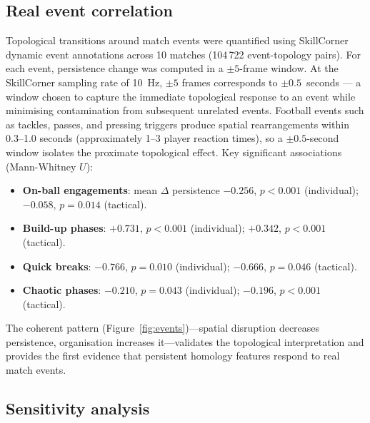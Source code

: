 \documentclass[11pt,a4paper]{article}
\begin{document}
\subsection{Real event correlation}
\label{sec:event_correlation}

Topological transitions around match events were quantified
using SkillCorner dynamic event annotations across 10 matches
(104\,722 event-topology pairs).  For each event, persistence
change was computed in a \(\pm 5\)-frame window.  At the
SkillCorner sampling rate of 10~Hz, \(\pm 5\) frames
corresponds to \(\pm 0.5\)~seconds --- a window chosen to
capture the immediate topological response to an event while
minimising contamination from subsequent unrelated events.
Football events such as tackles, passes, and pressing
triggers produce spatial rearrangements within 0.3--1.0
seconds (approximately 1--3 player reaction times), so a
\(\pm 0.5\)-second window isolates the proximate topological
effect.  Key significant associations (Mann-Whitney \(U\)):

\begin{itemize}
  \item \textbf{On-ball engagements}: mean \(\Delta\)
        persistence \(-0.256\), \(p < 0.001\) (individual);
        \(-0.058\), \(p = 0.014\) (tactical).
  \item \textbf{Build-up phases}: \(+0.731\), \(p < 0.001\)
        (individual); \(+0.342\), \(p < 0.001\) (tactical).
  \item \textbf{Quick breaks}: \(-0.766\), \(p = 0.010\)
        (individual); \(-0.666\), \(p = 0.046\) (tactical).
  \item \textbf{Chaotic phases}: \(-0.210\), \(p = 0.043\)
        (individual); \(-0.196\), \(p < 0.001\) (tactical).
\end{itemize}

\noindent
The coherent pattern (Figure~\ref{fig:events})---spatial
disruption decreases persistence, organisation increases
it---validates the topological interpretation and provides the
first evidence that persistent homology features respond to
real match events.

\subsection{Sensitivity analysis}
\label{sec:sensitivity}
\end{document}
